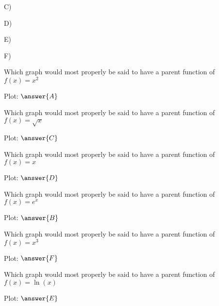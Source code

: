 \documentclass{ximera}
\begin{document}
C) 
D) 

E) 
F) 

\begin{problem}
    Which graph would most properly be said to have a parent function of $f(x) = x^2$

    Plot: $\answer{A}$
\end{problem}
\begin{problem}
    Which graph would most properly be said to have a parent function of $f(x) = \sqrt{x}$

     Plot: $\answer{C}$
\end{problem}
\begin{problem}
    Which graph would most properly be said to have a parent function of $f(x) = x$

    Plot: $\answer{D}$
\end{problem}
\begin{problem}
   Which graph would most properly be said to have a parent function of $f(x) = e^x$

    Plot: $\answer{B}$
\end{problem}
\begin{problem}
    Which graph would most properly be said to have a parent function of $f(x) = x^3$

    Plot: $\answer{F}$
\end{problem}
\begin{problem}
    Which graph would most properly be said to have a parent function of $f(x) = \ln(x)$

    Plot: $\answer{E}$
\end{problem}
\end{document}
